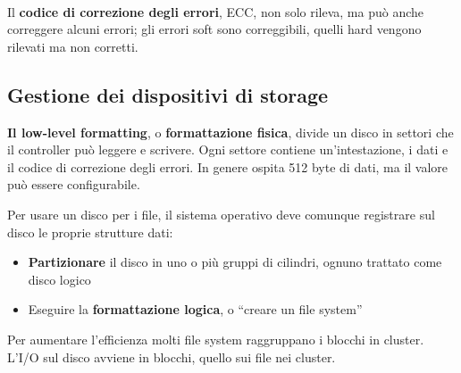 \paragraph{}

Il \textbf{codice di correzione degli errori}, ECC, non solo rileva, ma può anche correggere alcuni errori; gli errori soft sono correggibili, quelli hard vengono rilevati ma non corretti.


\subsection{Gestione dei dispositivi di storage}

\textbf{Il low-level formatting}, o \textbf{formattazione fisica}, divide un disco in settori che il controller può leggere e scrivere. Ogni settore contiene un'intestazione, i dati e il codice di correzione degli errori. In genere ospita 512 byte di dati, ma il valore può essere configurabile.

Per usare un disco per i file, il sistema operativo deve comunque registrare sul disco le proprie strutture dati:

\begin{itemize}
  \item \textbf{Partizionare} il disco in uno o più gruppi di cilindri, ognuno trattato come disco logico
  \item Eseguire la \textbf{formattazione logica}, o “creare un file system”
\end{itemize}

Per aumentare l'efficienza molti file system raggruppano i blocchi in cluster. L'I/O sul disco avviene in blocchi, quello sui file nei cluster.


\paragraph{}

